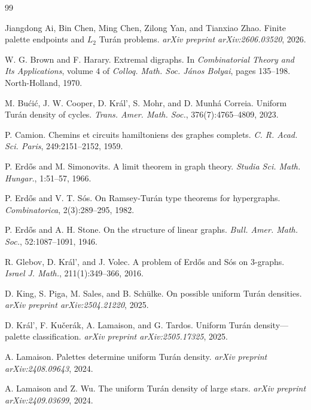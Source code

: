 \documentclass[a4paper]{amsart}
\begin{document}
\begin{thebibliography}{99}

Jiangdong Ai, Bin Chen, Ming Chen, Zilong Yan, and Tianxiao Zhao.
\newblock Finite palette endpoints and $L_2$ Tur\'an problems.
\newblock \emph{arXiv preprint arXiv:2606.03520}, 2026.

W. G. Brown and F. Harary.
\newblock Extremal digraphs.
\newblock In \emph{Combinatorial Theory and Its Applications}, volume 4 of \emph{Colloq. Math. Soc. J\'anos Bolyai}, pages 135--198. North-Holland, 1970.

M. Bu\'ci\'c, J. W. Cooper, D. Kr\'al', S. Mohr, and D. Munh\'a Correia.
\newblock Uniform Tur\'an density of cycles.
\newblock \emph{Trans. Amer. Math. Soc.}, 376(7):4765--4809, 2023.

P. Camion.
\newblock Chemins et circuits hamiltoniens des graphes complets.
\newblock \emph{C. R. Acad. Sci. Paris}, 249:2151--2152, 1959.

P. Erd\H{o}s and M. Simonovits.
\newblock A limit theorem in graph theory.
\newblock \emph{Studia Sci. Math. Hungar.}, 1:51--57, 1966.

P. Erd\H{o}s and V. T. S\'os.
\newblock On Ramsey-Tur\'an type theorems for hypergraphs.
\newblock \emph{Combinatorica}, 2(3):289--295, 1982.

P. Erd\H{o}s and A. H. Stone.
\newblock On the structure of linear graphs.
\newblock \emph{Bull. Amer. Math. Soc.}, 52:1087--1091, 1946.

R. Glebov, D. Kr\'al', and J. Volec.
\newblock A problem of Erd\H{o}s and S\'os on 3-graphs.
\newblock \emph{Israel J. Math.}, 211(1):349--366, 2016.

D. King, S. Piga, M. Sales, and B. Sch\"ulke.
\newblock On possible uniform Tur\'an densities.
\newblock \emph{arXiv preprint arXiv:2504.21220}, 2025.

D. Kr\'al', F. Ku\v{c}er\'ak, A. Lamaison, and G. Tardos.
\newblock Uniform Tur\'an density---palette classification.
\newblock \emph{arXiv preprint arXiv:2505.17325}, 2025.

A. Lamaison.
\newblock Palettes determine uniform Tur\'an density.
\newblock \emph{arXiv preprint arXiv:2408.09643}, 2024.

A. Lamaison and Z. Wu.
\newblock The uniform Tur\'an density of large stars.
\newblock \emph{arXiv preprint arXiv:2409.03699}, 2024.


\end{thebibliography}
\end{document}
